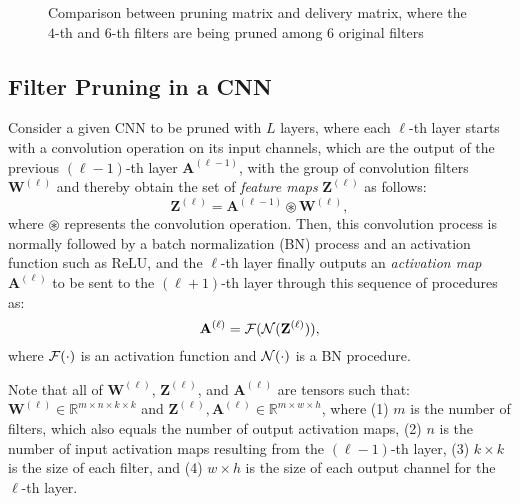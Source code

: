 \begin{figure*}[t]
	\centering
    \caption{Comparison between pruning matrix and delivery matrix, where the $4$-th and $6$-th filters are being pruned among $6$ original filters}
	\label{fig:matrix}
	\vspace{-2mm}
\end{figure*}



\subsection{Filter Pruning in a CNN}
Consider a given CNN to be pruned with $L$ layers, where each $\ell$-th layer starts with a convolution operation on its input channels, which are the output of the previous $(\ell-1)$-th layer $\mathbf{A}^{(\ell-1)}$, with the group of convolution filters $\mathbf{W}^{{(\ell)}}$ and thereby obtain the set of \textit{feature maps} $\mathbf{Z}^{(\ell)}$ as follows:
\begin{equation}
\boldsymbol{\mathbf{Z}}^{(\ell)} = {\mathbf{A}^{(\ell-1)} \circledast {\mathbf{W}}^{(\ell)}},
\nonumber
\end{equation}
where $\circledast$ represents the convolution operation. Then, this convolution process is normally followed by a batch normalization (BN) process and an activation function such as ReLU, and the $\ell$-th layer finally outputs an \textit{activation map} $\mathbf{A}^{(\ell)}$ to be sent to the $(\ell+1)$-th layer through this sequence of procedures as:
\begin{equation}
\mathbf{A}^{(\ell)} = \mathcal{F}(\mathcal{N}(\mathbf{Z}^{(\ell)})),
\nonumber
\end{equation}
where $\mathcal{F}(\cdot)$ is an activation function and $\mathcal{N}(\cdot)$ is a BN procedure.

Note that all of $\mathbf{W}^{(\ell)}$, $\mathbf{Z}^{(\ell)}$, and $\mathbf{A}^{(\ell)}$ are tensors such that: $\mathbf{W}^{(\ell)} \in \mathbb{R}^{m \times n \times k \times k}$ and $\mathbf{Z}^{(\ell)},\mathbf{A}^{(\ell)} \in \mathbb{R}^{m \times w \times h}$, where (1) $m$ is the number of filters, which also equals the number of output activation maps, (2) $n$ is the number of input activation maps resulting from the $(\ell-1)$-th layer, (3) $k \times k$ is the size of each filter, and (4) $w \times h$ is the size of each output channel for the $\ell$-th layer.

